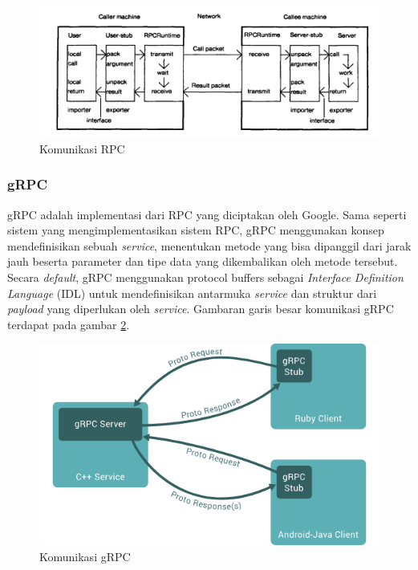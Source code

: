 \begin{figure}[H]
  \centering
  \includegraphics[scale=0.35]{gambar/rpc-communication-2.png}
  \caption{Komunikasi RPC \parencite{implementing-rpc}}
  \label{fig:rpc-communication-2}
\end{figure}

\subsubsection{gRPC}

gRPC adalah implementasi dari RPC yang diciptakan oleh Google. Sama seperti sistem
yang mengimplementasikan sistem RPC, gRPC menggunakan konsep mendefinisikan sebuah \emph{service},
menentukan metode yang bisa dipanggil dari jarak jauh beserta parameter dan tipe data yang
dikembalikan oleh metode tersebut. Secara \emph{default}, gRPC menggunakan protocol buffers
sebagai \emph{Interface Definition Language} (IDL) untuk mendefinisikan antarmuka \emph{service}
dan struktur dari \emph{payload} yang diperlukan oleh \emph{service}. Gambaran garis besar
komunikasi gRPC terdapat pada gambar \ref{fig:grpc-top-level}.

\begin{figure}[H]
  \centering
  \includegraphics[scale=0.5]{gambar/grpc-usage-image.png}
  \caption{Komunikasi gRPC \parencite{grpc-website-docs-overview}}
  \label{fig:grpc-top-level}
\end{figure}


